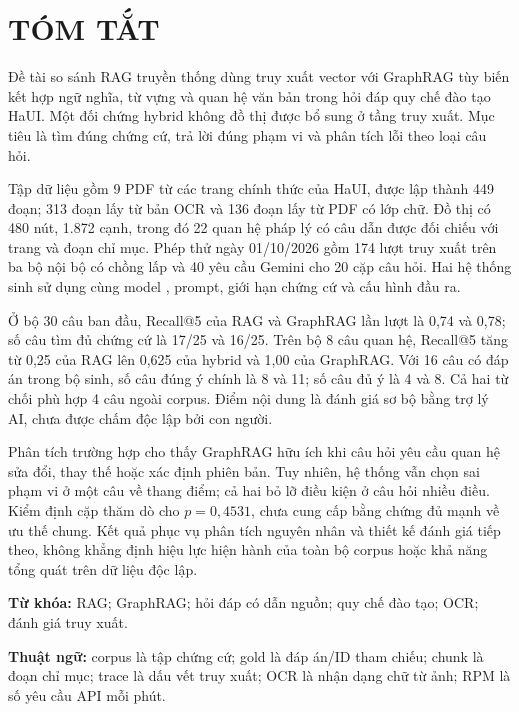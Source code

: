 \section*{TÓM TẮT}
Đề tài so sánh RAG truyền thống dùng truy xuất vector với GraphRAG tùy biến kết hợp ngữ nghĩa, từ vựng và quan hệ văn bản trong hỏi đáp quy chế đào tạo HaUI. Một đối chứng hybrid không đồ thị được bổ sung ở tầng truy xuất. Mục tiêu là tìm đúng chứng cứ, trả lời đúng phạm vi và phân tích lỗi theo loại câu hỏi.

Tập dữ liệu gồm 9 PDF từ các trang chính thức của HaUI, được lập thành 449 đoạn; 313 đoạn lấy từ bản OCR và 136 đoạn lấy từ PDF có lớp chữ. Đồ thị có 480 nút, 1.872 cạnh, trong đó 22 quan hệ pháp lý có câu dẫn được đối chiếu với trang và đoạn chỉ mục. Phép thử ngày 01/10/2026 gồm 174 lượt truy xuất trên ba bộ nội bộ có chồng lấp và 40 yêu cầu Gemini cho 20 cặp câu hỏi. Hai hệ thống sinh sử dụng cùng model , prompt, giới hạn chứng cứ và cấu hình đầu ra.

Ở bộ 30 câu ban đầu, Recall@5 của RAG và GraphRAG lần lượt là 0,74 và 0,78; số câu tìm đủ chứng cứ là 17/25 và 16/25. Trên bộ 8 câu quan hệ, Recall@5 tăng từ 0,25 của RAG lên 0,625 của hybrid và 1,00 của GraphRAG. Với 16 câu có đáp án trong bộ sinh, số câu đúng ý chính là 8 và 11; số câu đủ ý là 4 và 8. Cả hai từ chối phù hợp 4 câu ngoài corpus. Điểm nội dung là đánh giá sơ bộ bằng trợ lý AI, chưa được chấm độc lập bởi con người.

Phân tích trường hợp cho thấy GraphRAG hữu ích khi câu hỏi yêu cầu quan hệ sửa đổi, thay thế hoặc xác định phiên bản. Tuy nhiên, hệ thống vẫn chọn sai phạm vi ở một câu về thang điểm; cả hai bỏ lỡ điều kiện ở câu hỏi nhiều điều. Kiểm định cặp thăm dò cho $p=0{,}4531$, chưa cung cấp bằng chứng đủ mạnh về ưu thế chung. Kết quả phục vụ phân tích nguyên nhân và thiết kế đánh giá tiếp theo, không khẳng định hiệu lực hiện hành của toàn bộ corpus hoặc khả năng tổng quát trên dữ liệu độc lập.

\noindent\textbf{Từ khóa:} RAG; GraphRAG; hỏi đáp có dẫn nguồn; quy chế đào tạo; OCR; đánh giá truy xuất.

\noindent\textbf{Thuật ngữ:} corpus là tập chứng cứ; gold là đáp án/ID tham chiếu; chunk là đoạn chỉ mục; trace là dấu vết truy xuất; OCR là nhận dạng chữ từ ảnh; RPM là số yêu cầu API mỗi phút.
